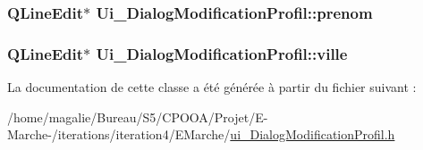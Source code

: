 \hypertarget{class_ui___dialog_modification_profil_a34af0438ab4d51c5a1cbd3171ca56fbf}{
\subsubsection[{prenom}]{\setlength{\rightskip}{0pt plus 5cm}Q\-Line\-Edit$\ast$ Ui\-\_\-\-Dialog\-Modification\-Profil\-::prenom}}\label{class_ui___dialog_modification_profil_a34af0438ab4d51c5a1cbd3171ca56fbf}
\hypertarget{class_ui___dialog_modification_profil_a1c6d48ece9604745e80462ef426ac0ea}{
\subsubsection[{ville}]{\setlength{\rightskip}{0pt plus 5cm}Q\-Line\-Edit$\ast$ Ui\-\_\-\-Dialog\-Modification\-Profil\-::ville}}\label{class_ui___dialog_modification_profil_a1c6d48ece9604745e80462ef426ac0ea}


La documentation de cette classe a été générée à partir du fichier suivant \-:\begin{DoxyCompactItemize}
\item 
/home/magalie/\-Bureau/\-S5/\-C\-P\-O\-O\-A/\-Projet/\-E-\/\-Marche-\//iterations/iteration4/\-E\-Marche/\hyperlink{ui___dialog_modification_profil_8h}{ui\-\_\-\-Dialog\-Modification\-Profil.\-h}\end{DoxyCompactItemize}
